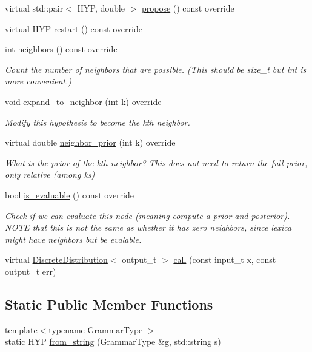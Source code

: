 \begin{DoxyCompactItemize}
virtual std\+::pair$<$ H\+YP, double $>$ \hyperlink{class_lexicon_afa8ea51bbd16df5f46557fe10db84980}{propose} () const override
\item 
virtual H\+YP \hyperlink{class_lexicon_ac8577ba9b4554ebf1852020c617bd7df}{restart} () const override
\item 
int \hyperlink{class_lexicon_a6419f323377d4c524363707eee0cae09}{neighbors} () const override
\begin{DoxyCompactList}\small\item\em Count the number of neighbors that are possible. (This should be size\+\_\+t but int is more convenient.) \end{DoxyCompactList}\item 
void \hyperlink{class_lexicon_a2b17608f66415c6a7d55b6a8f344db21}{expand\+\_\+to\+\_\+neighbor} (int k) override
\begin{DoxyCompactList}\small\item\em Modify this hypothesis to become the k\textquotesingle{}th neighbor. \end{DoxyCompactList}\item 
virtual double \hyperlink{class_lexicon_ad237c78e3435223f344d153da3baba9b}{neighbor\+\_\+prior} (int k) override
\begin{DoxyCompactList}\small\item\em What is the prior of the k\textquotesingle{}th neighbor? This does not need to return the full prior, only relative (among ks) \end{DoxyCompactList}\item 
bool \hyperlink{class_lexicon_ab9fcefbd8598a5401a39bd59e8043db9}{is\+\_\+evaluable} () const override
\begin{DoxyCompactList}\small\item\em Check if we can evaluate this node (meaning compute a prior and posterior). N\+O\+TE that this is not the same as whether it has zero neighbors, since lexica might have neighbors but be evalable. \end{DoxyCompactList}\item 
virtual \hyperlink{class_discrete_distribution}{Discrete\+Distribution}$<$ output\+\_\+t $>$ \hyperlink{class_lexicon_afc6b762f68c6033a501ce7ca04b01ece}{call} (const input\+\_\+t x, const output\+\_\+t err)
\end{DoxyCompactItemize}
\subsection*{Static Public Member Functions}
\begin{DoxyCompactItemize}
\item 
{\footnotesize template$<$typename Grammar\+Type $>$ }\\static H\+YP \hyperlink{class_lexicon_a9c9fd97a05a82e4f8b202850f8e8802c}{from\+\_\+string} (Grammar\+Type \&g, std\+::string s)
\end{DoxyCompactItemize}
